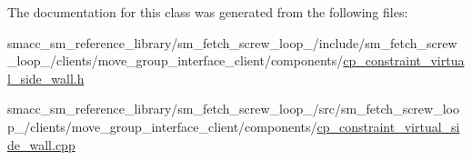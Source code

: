 The documentation for this class was generated from the following files\+:\begin{DoxyCompactItemize}
\item 
smacc\+\_\+sm\+\_\+reference\+\_\+library/sm\+\_\+fetch\+\_\+screw\+\_\+loop\+\_/include/sm\+\_\+fetch\+\_\+screw\+\_\+loop\+\_/clients/move\+\_\+group\+\_\+interface\+\_\+client/components/\hyperlink{sm__fetch__screw__loop__1_2include_2sm__fetch__screw__loop__1_2clients_2move__group__interface__2973b596c5e2c0df601329489855784d}{cp\+\_\+constraint\+\_\+virtual\+\_\+side\+\_\+wall.\+h}\item 
smacc\+\_\+sm\+\_\+reference\+\_\+library/sm\+\_\+fetch\+\_\+screw\+\_\+loop\+\_/src/sm\+\_\+fetch\+\_\+screw\+\_\+loop\+\_/clients/move\+\_\+group\+\_\+interface\+\_\+client/components/\hyperlink{sm__fetch__screw__loop__1_2src_2sm__fetch__screw__loop__1_2clients_2move__group__interface__clie36fd24b5e8da3c87f2db2218c4264596}{cp\+\_\+constraint\+\_\+virtual\+\_\+side\+\_\+wall.\+cpp}\end{DoxyCompactItemize}
